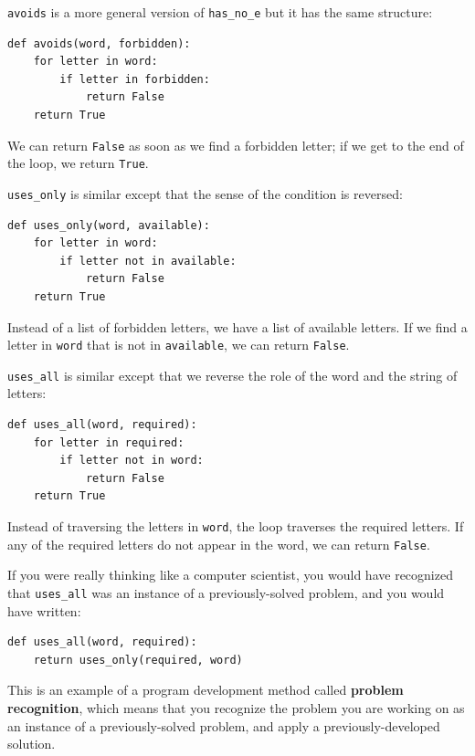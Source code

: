 \documentclass[10pt]{book}
\begin{document}




{\tt avoids} is a more general version of \verb"has_no_e" but it
has the same structure:

\beforeverb
\begin{verbatim}
def avoids(word, forbidden):
    for letter in word:
        if letter in forbidden:
            return False
    return True
\end{verbatim}
\afterverb
%
We can return {\tt False} as soon as we find a forbidden letter;
if we get to the end of the loop, we return {\tt True}.

\verb"uses_only" is similar except that the sense of the condition
is reversed:

\beforeverb
\begin{verbatim}
def uses_only(word, available):
    for letter in word: 
        if letter not in available:
            return False
    return True
\end{verbatim}
\afterverb
%
Instead of a list of forbidden letters, we have a list of available
letters.  If we find a letter in {\tt word} that is not in
{\tt available}, we can return {\tt False}.

\verb"uses_all" is similar except that we reverse the role
of the word and the string of letters:

\beforeverb
\begin{verbatim}
def uses_all(word, required):
    for letter in required: 
        if letter not in word:
            return False
    return True
\end{verbatim}
\afterverb
%
Instead of traversing the letters in {\tt word}, the loop
traverses the required letters.  If any of the required letters
do not appear in the word, we can return {\tt False}.


If you were really thinking like a computer scientist, you would
have recognized that \verb"uses_all" was an instance of a
previously-solved problem, and you would have written:

\beforeverb
\begin{verbatim}
def uses_all(word, required):
    return uses_only(required, word)
\end{verbatim}
\afterverb
%
This is an example of a program development method called {\bf problem
recognition}, which means that you recognize the problem you are
working on as an instance of a previously-solved problem, and apply a
previously-developed solution.
\end{document}
